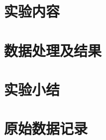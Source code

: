 \documentclass[12pt,a4paper]{amsart}
\begin{document}
\section{实验内容}
\section{数据处理及结果}
\section{实验小结}
\section{原始数据记录}


\appendix



{\footnotesize}
\end{document}

